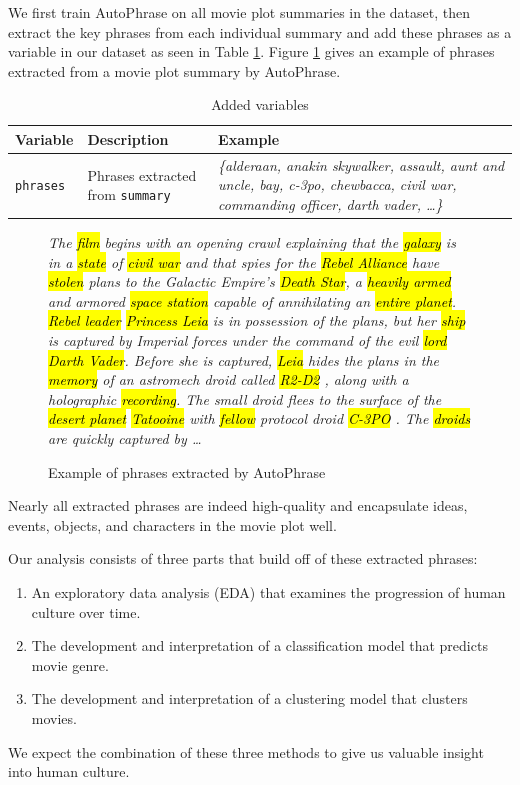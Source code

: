 \documentclass{article}
\begin{document}
\begin{multicols}{2}
We first train AutoPhrase on all movie plot summaries in the dataset, then extract the key phrases from each individual summary and add these phrases as a variable in our dataset as seen in Table \ref{table:additional_variables}. Figure \ref{figure:key_phrases_example} gives an example of phrases extracted from a movie plot summary by AutoPhrase.

\begin{table}
\caption{Added variables}
\centering
\begin{tabularx}{.8\textwidth}{llX}
    \textbf{Variable} & \textbf{Description} & \textbf{Example} \\
    \hline
    \texttt{phrases} & Phrases extracted from \texttt{summary} & \textit{\{alderaan, anakin skywalker, assault, aunt and uncle, bay, c-3po, chewbacca, civil war, commanding officer, darth vader, \ldots\}} \\
\end{tabularx}
\label{table:additional_variables}
\end{table}

\begin{figure}
\caption{Example of phrases extracted by AutoPhrase}
\begin{quoting}[leftmargin=.1\textwidth]
\small\textit{The \hl{film} begins with an opening crawl explaining that the \hl{galaxy} is in a \hl{state} of \hl{civil war} and that spies for the \hl{Rebel Alliance} have \hl{stolen} plans to the Galactic Empire's \hl{Death Star}, a \hl{heavily armed} and armored \hl{space station} capable of annihilating an \hl{entire planet}. \hl{Rebel leader} \hl{Princess Leia} is in possession of the plans, but her \hl{ship} is captured by Imperial forces under the command of the evil \hl{lord} \hl{Darth Vader}. Before she is captured, \hl{Leia} hides the plans in the \hl{memory} of an astromech droid called \hl{R2-D2} , along with a holographic \hl{recording}. The small droid flees to the surface of the \hl{desert planet} \hl{Tatooine} with \hl{fellow} protocol droid \hl{C-3PO} . The \hl{droids} are quickly captured by \ldots}
\end{quoting}
\label{figure:key_phrases_example}
\end{figure}

Nearly all extracted phrases are indeed high-quality and encapsulate ideas, events, objects, and characters in the movie plot well.

Our analysis consists of three parts that build off of these extracted phrases:
\begin{enumerate}
    \item An exploratory data analysis (EDA) that examines the progression of human culture over time.
    \item The development and interpretation of a classification model that predicts movie genre.
    \item The development and interpretation of a clustering model that clusters movies.
\end{enumerate}
We expect the combination of these three methods to give us valuable insight into human culture.

\end{multicols}
\end{document}
